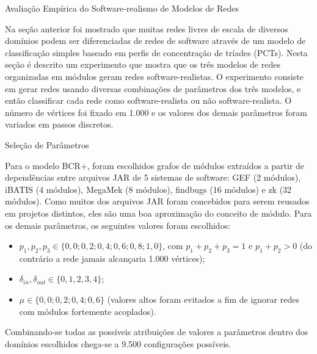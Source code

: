 \begin{section}{Avaliação Empírica do Software-realismo de Modelos de Redes}

Na seção anterior foi mostrado que muitas redes livres de escala de diversos domínios podem ser diferenciadas de redes de software através de um modelo de classificação simples baseado em perfis de concentração de tríades (PCTs). Nesta seção é descrito um experimento que mostra que os três modelos de redes organizadas em módulos geram redes software-realistas. O experimento consiste em gerar redes usando diversas combinações de parâmetros dos três modelos, e então classificar cada rede como software-realista ou não software-realista. O número de vértices foi fixado em 1.000 e os valores dos demais parâmetros foram variados em passos discretos. 


\begin{subsection}{Seleção de Parâmetros} \label{sec:parametros}

Para o modelo BCR+, foram escolhidos grafos de módulos extraídos a partir de dependências entre arquivos JAR de 5 sistemas de software: GEF (2 módulos), iBATIS (4 módulos), MegaMek (8 módulos), findbugs (16 módulos) e zk (32 módulos). Como muitos dos arquivos JAR foram concebidos para serem reusados em projetos distintos, eles são uma boa aproximação do conceito de módulo. Para os demais parâmetros, os seguintes valores foram escolhidos:

\begin{itemize}
	\item $p_1, p_2, p_3 \in \{0,0; 0,2; 0,4; 0,6; 0,8; 1,0\}$, com $p_1 + p_2 + p_3 = 1$ e $p_1 + p_2 > 0$ (do contrário a rede jamais alcançaria 1.000 vértices);
	\item $\delta_{in}, \delta_{out} \in \{0, 1, 2, 3, 4\}$;
	\item $\mu \in \{0,0; 0,2; 0,4; 0,6\}$ (valores altos foram evitados a fim de ignorar redes com módulos fortemente acoplados).
\end{itemize}

Combinando-se todas as possíveis atribuições de valores a parâmetros dentro dos domínios escolhidos chega-se a 9.500 configurações possíveis.


\end{subsection}
\end{section}
